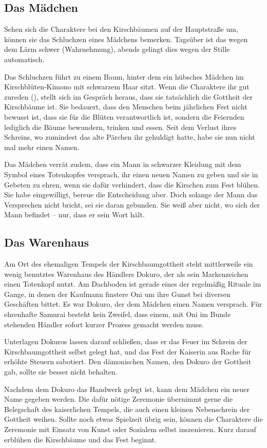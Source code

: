 {		\subsection{Das Mädchen}

			Sehen sich die Charaktere bei den Kirschbäumen auf der Hauptstraße um, können sie das Schluchzen eines Mädchens bemerken. Tagsüber ist das wegen dem Lärm schwer (Wahrnehmung), abends gelingt dies wegen der Stille automatisch.

			Das Schluchzen führt zu einem Baum, hinter dem ein hübsches Mädchen im Kirschblüten-Kimono mit schwarzem Haar sitzt. Wenn die Charaktere ihr gut zureden (), stellt sich im Gespräch heraus, dass sie tatsächlich die Gottheit der Kirschbäume ist. Sie bedauert, dass den Menschen beim jährlichen Fest nicht bewusst ist, dass sie für die Blüten verantwortlich ist, sondern die Feiernden lediglich die Bäume bewundern, trinken und essen. Seit dem Verlust ihres Schreins, wo zumindest das alte Pärchen ihr gehuldigt hatte, habe sie nun nicht mal mehr einen Namen.

			Das Mädchen verrät zudem, dass ein Mann in schwarzer Kleidung mit dem Symbol eines Totenkopfes versprach, ihr einen neuen Namen zu geben und sie in Gebeten zu ehren, wenn sie dafür verhindert, dass die Kirschen zum Fest blühen. Sie habe eingewilligt, bereue die Entscheidung aber. Doch solange der Mann das Versprechen nicht bricht, sei sie daran gebunden. Sie weiß aber nicht, wo sich der Mann befindet -- nur, dass er sein Wort hält.

		\subsection{Das Warenhaus}

			Am Ort des ehemaligen Tempels der Kirschbaumgottheit steht mittlerweile ein wenig benutztes Warenhaus des Händlers Dokuro, der als sein Markenzeichen einen Totenkopf nutzt. Am Dachboden ist gerade eines der regelmäßig Rituale im Gange, in denen der Kaufmann finstere Oni um ihre Gunst bei diversen Geschäften bittet. Es war Dokuro, der dem Mädchen einen Namen versprach. Für ehrenhafte Samurai besteht kein Zweifel, dass einem, mit Oni im Bunde stehenden Händler sofort kurzer Prozess gemacht werden muss.


			Unterlagen Dokuros lassen darauf schließen, dass er das Feuer im Schrein der Kirschbaumgottheit selbst gelegt hat, und das Fest der Kaiserin aus Rache für erhöhte Steuern sabotiert. Den dämonischen Namen, den Dokuro der Gottheit gab, sollte sie besser nicht behalten.


		\noindent
		Nachdem dem Dokuro das Handwerk gelegt ist, kann dem Mädchen ein neuer Name gegeben werden. Die dafür nötige Zeremonie übernimmt gerne die Belegschaft des kaiserlichen Tempels, die auch einen kleinen Nebenschrein der Gottheit weihen. Sollte noch etwas Spielzeit übrig sein, können die Charaktere die Zeremonie mit Einsatz von Kunst oder Sozialem selbst inszenieren. Kurz darauf erblühen die Kirschbäume und das Fest beginnt.
}

